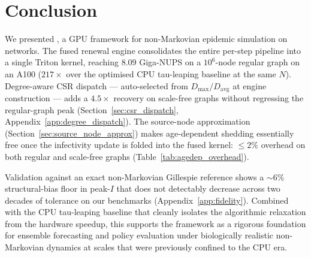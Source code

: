 \section{Conclusion}\label{sec:conclusion}

We presented \flashspread{}, a GPU framework for non-Markovian epidemic simulation on networks. The fused renewal engine consolidates the entire per-step pipeline into a single Triton kernel, reaching 8.09 Giga-NUPS on a $10^6$-node regular graph on an A100 ($217\times$ over the optimised CPU tau-leaping baseline at the same $N$). Degree-aware CSR dispatch --- auto-selected from $D_{\max}/D_{\mathrm{avg}}$ at engine construction --- adds a $4.5\times$ recovery on scale-free graphs without regressing the regular-graph peak (Section~\ref{sec:csr_dispatch}, Appendix~\ref{app:degree_dispatch}). The source-node approximation (Section~\ref{sec:source_node_approx}) makes age-dependent shedding essentially free once the infectivity update is folded into the fused kernel: $\leq 2\%$ overhead on both regular and scale-free graphs (Table~\ref{tab:agedep_overhead}).

Validation against an exact non-Markovian Gillespie reference shows a $\sim$6\% structural-bias floor in peak-$I$ that does not detectably decrease across two decades of tolerance on our benchmarks (Appendix~\ref{app:fidelity}). Combined with the CPU tau-leaping baseline that cleanly isolates the algorithmic relaxation from the hardware speedup, this supports the framework as a rigorous foundation for ensemble forecasting and policy evaluation under biologically realistic non-Markovian dynamics at scales that were previously confined to the CPU era.
